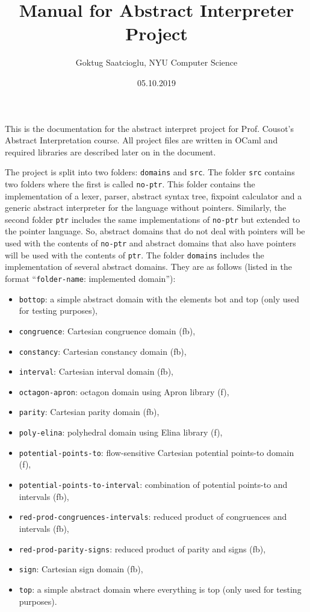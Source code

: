 \documentclass [10pt]{article}
\begin{document}
\title{Manual for Abstract Interpreter Project}
\author{Goktug Saatcioglu, NYU Computer Science}
\date{05.10.2019}
\maketitle

This is the documentation for the abstract interpret project for Prof. Cousot's Abstract Interpretation course. All project files are written in OCaml and required libraries are described later on in the document.\par
The project is split into two folders: \verb|domains| and \verb|src|. The folder \verb|src| contains two folders where the first is called \verb|no-ptr|. This folder contains the implementation of a lexer, parser, abstract syntax tree, fixpoint calculator and a generic abstract interpreter for the language without pointers. Similarly, the second folder \verb|ptr| includes the same implementations of \verb|no-ptr| but extended to the pointer language. So, abstract domains that do not deal with pointers will be used with the contents of \verb|no-ptr| and abstract domains that also have pointers will be used with the contents of \verb|ptr|.\newline
The folder \verb|domains| includes the implementation of several abstract domains. They are as follows (listed in the format ``\verb|folder-name|: implemented domain''):
\begin{itemize}
  \item \verb|bottop|: a simple abstract domain with the elements bot and top (only used for testing purposes),
  \item \verb|congruence|: Cartesian congruence domain (fb),
  \item \verb|constancy|: Cartesian constancy domain (fb),
  \item \verb|interval|: Cartesian interval domain (fb),
  \item \verb|octagon-apron|: octagon domain using Apron library (f),
  \item \verb|parity|: Cartesian parity domain (fb),
  \item \verb|poly-elina|: polyhedral domain using Elina library (f),
  \item \verb|potential-points-to|: flow-sensitive Cartesian potential points-to domain (f),
  \item \verb|potential-points-to-interval|: combination of potential points-to and intervals (fb),
  \item \verb|red-prod-congruences-intervals|: reduced product of congruences and intervals (fb),
  \item \verb|red-prod-parity-signs|: reduced product of parity and signs (fb),
  \item \verb|sign|: Cartesian sign domain (fb),
  \item \verb|top|: a simple abstract domain where everything is top (only used for testing purposes).
\end{itemize}
\end{document}
